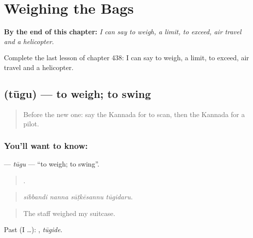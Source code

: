 
\chapter{Weighing the Bags}
\label{ch:ka-weighing-the-bags}

\begin{chapteropening}
\textbf{By the end of this chapter:} \emph{I can say to weigh, a limit, to exceed, air travel and a helicopter.}

Complete the last lesson of chapter 438: I can say to weigh, a limit, to exceed, air travel and a helicopter.
\end{chapteropening}

\section[\texorpdfstring{\kn{ತೂಗು} (tūgu)}{ತೂಗು (tūgu)}]{ (tūgu) — to weigh; to swing}

\label{lesson:KA-C438-tugu}



\begin{quote}
Before the new one: say the Kannada for to scan, then the Kannada for a pilot.
\end{quote}

\subsection*{You'll want to know: }
\textbf{} — \emph{tūgu} — \textquotedblleft{}to weigh; to swing\textquotedblright{}.

\begin{quote}
   .
\end{quote}

\begin{quote}
\emph{sibbandi nanna sūṭkēsannu tūgidaru.}
\end{quote}

\begin{quote}
The staff weighed my suitcase.
\end{quote}

Past (I …): , \emph{tūgide}.

